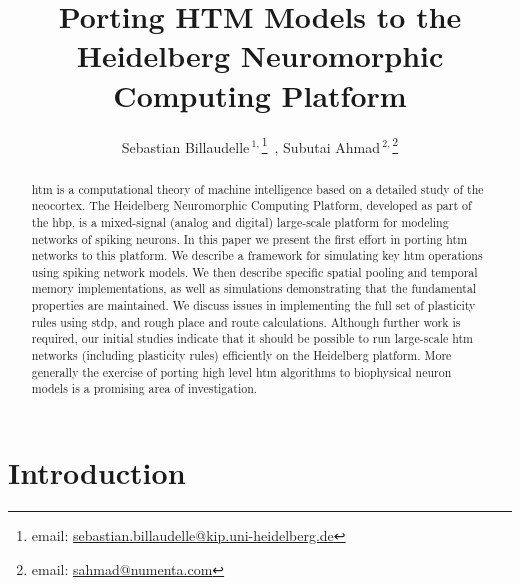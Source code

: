 \documentclass{reporter}
\begin{document}

\title[Porting HTM Models to the Heidelberg Neuromorphic Computing Platform]{Porting HTM Models to the Heidelberg Neuromorphic Computing Platform}
\author[Billaudelle et al.]{Sebastian Billaudelle\,$^{1,}$\footnote{email: \href{mailto:sebastian.billaudelle@kip.uni-heidelberg.de}{sebastian.billaudelle@kip.uni-heidelberg.de}}\ , Subutai Ahmad\,$^{2,}$\footnote{email: \href{mailto:sahmad@numenta.com}{sahmad@numenta.com}}}
\address{$^{1}$Kirchhoff-Institute for Physics, Heidelberg, Germany\\
$^{2}$Numenta, Inc., Redwood City, CA}



\maketitle

\begin{abstract}

\gls{htm} is a computational theory of machine
intelligence based on a detailed study of the neocortex. The Heidelberg
Neuromorphic Computing Platform, developed as part of the \gls{hbp},
is a mixed-signal (analog and digital) large-scale platform for
modeling networks of spiking neurons. In this paper we present the first effort
in porting \gls{htm} networks to this platform.  We describe a framework for
simulating key \gls{htm} operations  using spiking network models. We then describe
specific spatial pooling and temporal memory implementations, as well as
simulations demonstrating that the fundamental properties are maintained. We
discuss issues in implementing the full set of plasticity rules using \gls{stdp}, and
rough place and route calculations. Although further work is required, our
initial studies indicate that it should be  possible to run large-scale \gls{htm}
networks (including plasticity rules) efficiently on the Heidelberg platform.
More generally the exercise of porting high level \gls{htm} algorithms to biophysical
neuron models is a promising area of investigation.

\end{abstract}

\glsresetall

\section{Introduction}

\end{document}
